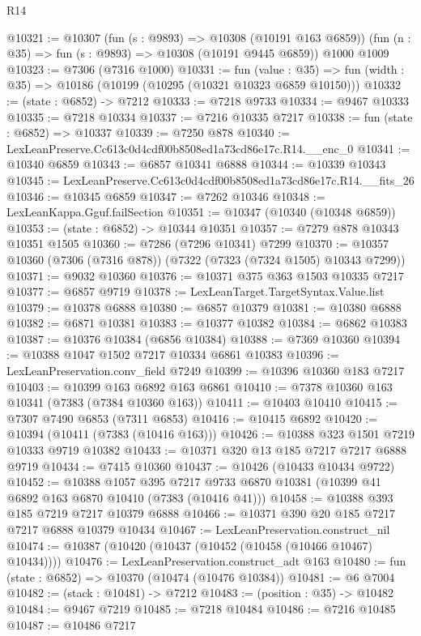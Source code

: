 \begin{lexlean}{R14}
\begin{coremodule}
@10321 := @10307
    (fun (s : @9893) => @10308 (@10191 @163 @6859))
    (fun (n : @35) => fun (s : @9893) => @10308 (@10191 @9445 @6859))
    @1000
    @1009
@10323 := @7306 (@7316 @1000)
@10331 := fun (value : @35) =>
  fun (width : @35) => @10186 (@10199 (@10295 (@10321 @10323 @6859 @10150)))
@10332 := (state : @6852) -> @7212
@10333 := @7218 @9733
@10334 := @9467 @10333
@10335 := @7218 @10334
@10337 := @7216 @10335 @7217
@10338 := fun (state : @6852) => @10337
@10339 := @7250 @878
@10340 := LexLeanPreserve.Cc613c0d4cdf00b8508ed1a73cd86e17c.R14.__enc_0
@10341 := @10340 @6859
@10343 := @6857 @10341 @6888
@10344 := @10339 @10343
@10345 := LexLeanPreserve.Cc613c0d4cdf00b8508ed1a73cd86e17c.R14.__fits_26
@10346 := @10345 @6859
@10347 := @7262 @10346
@10348 := LexLeanKappa.Gguf.failSection
@10351 := @10347 (@10340 (@10348 @6859))
@10353 := (state : @6852) -> @10344 @10351
@10357 := @7279 @878 @10343 @10351 @1505
@10360 := @7286 (@7296 @10341) @7299
@10370 := @10357 @10360 (@7306 (@7316 @878)) (@7322 (@7323 (@7324 @1505) @10343 @7299))
@10371 := @9032 @10360
@10376 := @10371 @375 @363 @1503 @10335 @7217
@10377 := @6857 @9719
@10378 := LexLeanTarget.TargetSyntax.Value.list
@10379 := @10378 @6888
@10380 := @6857 @10379
@10381 := @10380 @6888
@10382 := @6871 @10381
@10383 := @10377 @10382
@10384 := @6862 @10383
@10387 := @10376 @10384 (@6856 @10384)
@10388 := @7369 @10360
@10394 := @10388 @1047 @1502 @7217 @10334 @6861 @10383
@10396 := LexLeanPreservation.conv_field @7249
@10399 := @10396 @10360 @183 @7217
@10403 := @10399 @163 @6892 @163 @6861
@10410 := @7378 @10360 @163 @10341 (@7383 (@7384 @10360 @163))
@10411 := @10403 @10410
@10415 := @7307 @7490 @6853 (@7311 @6853)
@10416 := @10415 @6892
@10420 := @10394 (@10411 (@7383 (@10416 @163)))
@10426 := @10388 @323 @1501 @7219 @10333 @9719 @10382
@10433 := @10371 @320 @13 @185 @7217 @7217 @6888 @9719
@10434 := @7415 @10360
@10437 := @10426 (@10433 @10434 @9722)
@10452 := @10388
    @1057
    @395
    @7217
    @9733
    @6870
    @10381
    (@10399 @41 @6892 @163 @6870 @10410 (@7383 (@10416 @41)))
@10458 := @10388 @393 @185 @7219 @7217 @10379 @6888
@10466 := @10371 @390 @20 @185 @7217 @7217 @6888 @10379 @10434
@10467 := LexLeanPreservation.construct_nil
@10474 := @10387 (@10420 (@10437 (@10452 (@10458 (@10466 @10467) @10434))))
@10476 := LexLeanPreservation.construct_adt @163
@10480 := fun (state : @6852) => @10370 (@10474 (@10476 @10384))
@10481 := @6 @7004
@10482 := (stack : @10481) -> @7212
@10483 := (position : @35) -> @10482
@10484 := @9467 @7219
@10485 := @7218 @10484
@10486 := @7216 @10485
@10487 := @10486 @7217

\end{coremodule}
\end{lexlean}
